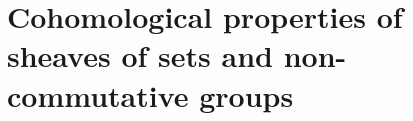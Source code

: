 \setcounter{chapter}{12}
\chapter{Cohomological properties of sheaves of sets and non-commutative groups}
